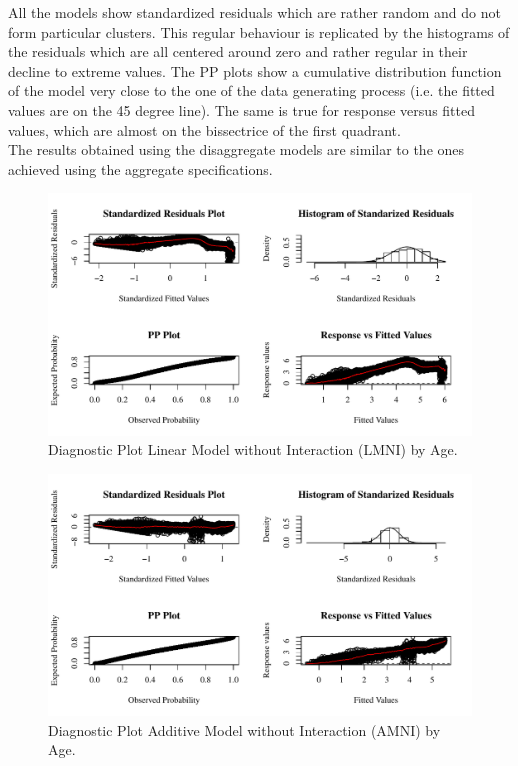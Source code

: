 \documentclass{article}\usepackage[]{graphicx}\usepackage[]{color}
\begin{document}
All the models show standardized residuals which are rather random and do not form particular clusters. This regular behaviour is replicated by the histograms of the residuals which are all centered around zero and rather regular in their decline to extreme values. The PP plots show a cumulative distribution function of the model very close to the one of the data generating process (i.e. the fitted values are on the 45 degree line). The same is true for response versus fitted values, which are almost on the bissectrice of the first quadrant.  \\
The results obtained using the disaggregate models are similar to the ones achieved using the aggregate specifications. 

\begin{figure}[bp!]
\centering
\includegraphics[scale=0.8]{Diag_b_lm_no_age_2004.pdf}
\caption{Diagnostic Plot Linear Model without Interaction (LMNI) by Age.}
\label{fig:Diag LMNI Age}
\end{figure}

\begin{figure}[bp!]
\centering
\includegraphics[scale=0.8]{Diag_b_gamm_age_2004.pdf}
\caption{Diagnostic Plot Additive Model without Interaction (AMNI) by Age.}
\label{fig:Diag AMNI Age}
\end{figure}
\end{document}
